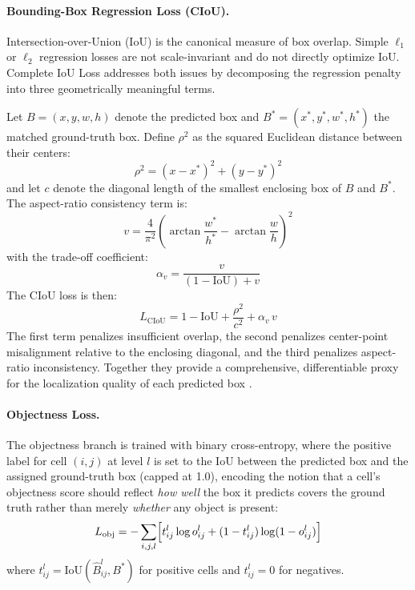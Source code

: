 \paragraph{Bounding-Box Regression Loss (CIoU).}
Intersection-over-Union (IoU) is the canonical measure of box
overlap. Simple $\ell_1$ or $\ell_2$ regression losses are not
scale-invariant and do not directly optimize IoU. Complete IoU
Loss \cite{zheng2020ciou} addresses both issues by
decomposing the regression penalty into three geometrically
meaningful terms.

Let $B = (x, y, w, h)$ denote the predicted box and
$B^* = (x^*, y^*, w^*, h^*)$ the matched ground-truth box.
Define $\rho^2$ as the squared Euclidean distance between
their centers:
\begin{equation}
  \rho^{2} =
  (x - x^{*})^{2} + (y - y^{*})^{2}
  \label{eq:ciou_dist}
\end{equation}
and let $c$ denote the diagonal length of the smallest
enclosing box of $B$ and $B^*$. The aspect-ratio consistency
term is:
\begin{equation}
  v = \frac{4}{\pi^{2}}
  \left(
    \arctan\frac{w^{*}}{h^{*}}
    - \arctan\frac{w}{h}
  \right)^{2}
  \label{eq:ciou_v}
\end{equation}
with the trade-off coefficient:
\begin{equation}
  \alpha_v =
  \frac{v}{(1 - \text{IoU}) + v}
  \label{eq:ciou_alpha}
\end{equation}
The CIoU loss is then:
\begin{equation}
  L_{\text{CIoU}} =
  1 - \text{IoU}
  + \frac{\rho^{2}}{c^{2}}
  + \alpha_v\,v
  \label{eq:ciou_loss}
\end{equation}
The first term penalizes insufficient overlap, the second
penalizes center-point misalignment relative to the enclosing
diagonal, and the third penalizes aspect-ratio inconsistency.
Together they provide a comprehensive, differentiable proxy for
the localization quality of each predicted box
\cite{zheng2020ciou,rezatofighi2019giou}.

\paragraph{Objectness Loss.}
The objectness branch is trained with binary cross-entropy,
where the positive label for cell $(i,j)$ at level $l$ is set
to the IoU between the predicted box and the assigned
ground-truth box (capped at 1.0), encoding the notion that a
cell's objectness score should reflect \textit{how well} the
box it predicts covers the ground truth rather than merely
\textit{whether} any object is present:
\begin{equation}
  L_{\text{obj}} = -\sum_{i,j,l}
  \Bigl[
    t_{ij}^{l} \log o_{ij}^{l}
    + (1 - t_{ij}^{l})\log(1 - o_{ij}^{l})
  \Bigr]
  \label{eq:obj_loss}
\end{equation}
where $t_{ij}^{l} = \text{IoU}(\hat{B}_{ij}^l, B^*)$ for
positive cells and $t_{ij}^{l} = 0$ for negatives.

